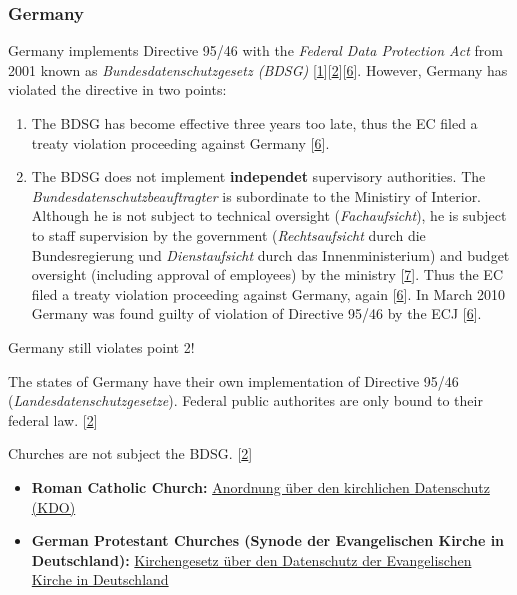 \subsubsection*{Germany}

Germany implements Directive 95/46 with the \emph{Federal Data Protection Act} from 2001 known as \emph{Bundesdatenschutzgesetz (BDSG)} {[}\hyperref[references]{1}{]}{[}\hyperref[references]{2}{]}{[}\hyperref[references]{6}{]}.
However, Germany has violated the directive in two points:

\begin{enumerate}
\item
The BDSG has become effective three years too late, thus the EC filed a treaty violation proceeding against Germany {[}\hyperref[references]{6}{]}.

\item
The BDSG does not implement \textbf{independet} supervisory authorities. 
The \emph{Bundesdatenschutzbeauftragter} is subordinate to the Ministiry of Interior. 
Although he is not subject to technical oversight (\emph{Fachaufsicht}), he is subject to staff supervision by the government (\emph{Rechtsaufsicht} durch die Bundesregierung und  \emph{Dienstaufsicht} durch das Innenministerium) and budget oversight (including approval of employees) by the ministry {[}\hyperref[references]{7}{]}. 
Thus the EC filed a treaty violation proceeding against Germany, again {[}\hyperref[references]{6}{]}. 
In March 2010 Germany was found guilty of violation of Directive 95/46 by the ECJ {[}\hyperref[references]{6}{]}.
\end{enumerate}

Germany still violates point 2!

The states of Germany have their own implementation of Directive 95/46 (\emph{Landesdatenschutzgesetze}).
Federal public authorites are only bound to their federal law. {[}\hyperref[references]{2}{]}

Churches are not subject the BDSG. {[}\hyperref[references]{2}{]}

\begin{itemize}

\item
\textbf{Roman Catholic Church:}
\href{http://de.wikipedia.org/wiki/Anordnung_\%C3\%BCber_den_kirchlichen_Datenschutz}{Anordnung  über den kirchlichen Datenschutz (KDO)}

\item
\textbf{German Protestant Churches (Synode der Evangelischen Kirche in Deutschland):}
\href{http://de.wikipedia.org/wiki/Datenschutzgesetz_der_Evangelischen_Kirche_in_Deutschland}{Kirchengesetz  über den Datenschutz der Evangelischen Kirche in Deutschland}
\end{itemize}

